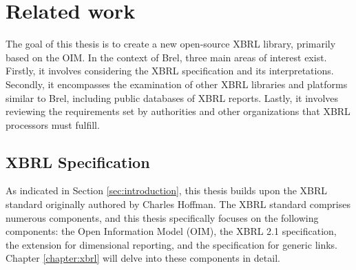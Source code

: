 \chapter{Related work}
\label{sec:related_work}

The goal of this thesis is to create a new open-source XBRL library, primarily based on the OIM.
In the context of Brel, three main areas of interest exist.
Firstly, it involves considering the XBRL specification and its interpretations.
Secondly, it encompasses the examination of other XBRL libraries and platforms similar to Brel, including public databases of XBRL reports.
Lastly, it involves reviewing the requirements set by authorities and other organizations that XBRL processors must fulfill.

\section{XBRL Specification}
As indicated in Section \ref{sec:introduction}, this thesis builds upon the XBRL standard originally authored by Charles Hoffman\cite{xbrl}.
The XBRL standard comprises numerous components, and this thesis specifically focuses on the following components: 
the Open Information Model (OIM)\cite{oim}, 
the XBRL 2.1 specification\cite{xbrl21}, 
the extension for dimensional reporting\cite{xbrl_dimensions}, 
and the specification for generic links\cite{xbrl_generic_links}.
Chapter \ref{chapter:xbrl} will delve into these components in detail.

